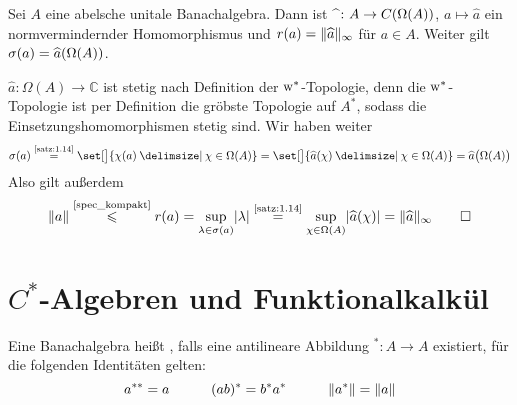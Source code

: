 \begin{satz}[label=satz:117,{name=[Gelfandtransformation ist normvermindernd]}]
	Sei $A$ eine abelsche unitale Banachalgebra. Dann ist $\widehat{\hspace{1ex}} \colon A \to C \enbrace*{\Omega(A)}$, $a \mapsto \widehat{a}$ ein normvermindernder Homomorphismus und 
	$r(a) = \Vert\widehat{a}\Vert_{\infty}$ für $a \in A$. Weiter gilt $\sigma(a)= \widehat{a}\enbrace*{\Omega(A)}$.
\end{satz}
\begin{beweis}
	$\widehat{a} \colon \Omega(A) \to \mathbb{C}$ ist stetig nach Definition der $\mathrm{w}^*$-Topologie, denn die $\mathrm{w}^*$-Topologie ist per Definition die gröbste Topologie auf $A^*$, sodass die Einsetzungshomomorphismen stetig sind.
	Wir haben weiter
	\[
		\sigma(a) \StackText{\ref{satz:1.14}}{=} \set[\big]{\chi(a) \given \chi \in \Omega(A)}  = \set[\big]{\widehat{a}(\chi) \given \chi \in \Omega(A)} = \widehat{a} 
		\enbrace[\big]{\Omega(A)}
	\]
	Also gilt außerdem
	\[
		\norm{a} \StackText{\ref{spec_kompakt}}{\le} r(a) = \sup_{\lambda \in \sigma(a)} \abs*{\lambda} \StackText{\ref{satz:1.14}}{=} \sup_{\chi \in \Omega(A)} \abs{\widehat{a}(\chi)} 
		= \norm{\widehat{a}}_{\infty} \qedhere
	\]
\end{beweis}
\newpage

\section{$C^*$-Algebren und Funktionalkalkül} %
\label{sec:2}

\begin{definition}[{name=[Involutive Banachalgebra]}]
	Eine Banachalgebra heißt , falls eine antilineare Abbildung ${}^* \colon A \to A$ existiert, für die folgenden Identitäten gelten:
	\[
		a^{**}=a \qquad \quad (ab)^*= b^* a^* \qquad \quad \Vert a^*\Vert = \Vert a\Vert  
	\] 
\end{definition}

